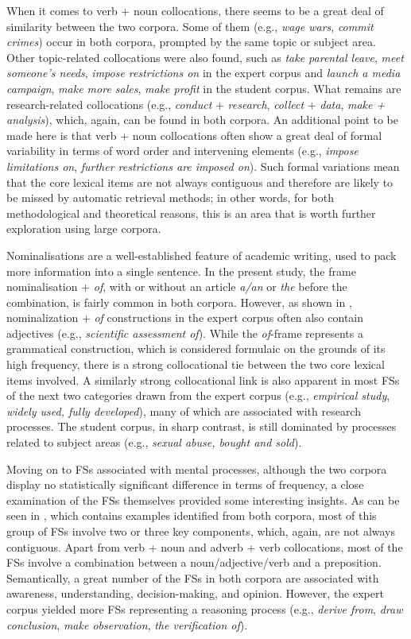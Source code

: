 When it comes to verb + noun collocations, there seems to be a great deal of similarity between the two corpora. Some of them (e.g., \textit{wage wars}, \textit{commit crimes}) occur in both corpora, prompted by the same topic or subject area. Other topic-related collocations were also found, such as \textit{take parental leave}, \textit{meet someone’s needs}, \textit{impose restrictions on} in the expert corpus and \textit{launch a media campaign}, \textit{make more sales}, \textit{make profit} in the student corpus. What remains are research-related collocations (e.g., \textit{conduct} + \textit{research}, \textit{collect} + \textit{data}, \textit{make + analysis}), which, again, can be found in both corpora. An additional point to be made here is that verb + noun collocations often show a great deal of formal variability in terms of word order and intervening elements (e.g., \textit{impose limitations on}, \textit{further restrictions are imposed on}). Such formal variations mean that the core lexical items are not always contiguous and therefore are likely to be missed by automatic retrieval methods; in other words, for both methodological and theoretical reasons, this is an area that is worth further exploration using large corpora. 

Nominalisations are a well-established feature of academic writing, used to pack more information into a single sentence. In the present study, the frame nominalisation + \textit{of}, with or without an article \textit{a/an} or \textit{the} before the combination, is fairly common in both corpora. However, as shown in , nominalization + \textit{of} constructions in the expert corpus often also contain adjectives (e.g., \textit{scientific assessment of}). While the \textit{of}{}-frame represents a grammatical construction, which is considered formulaic on the grounds of its high frequency, there is a strong collocational tie between the two core lexical items involved. A similarly strong collocational link is also apparent in most FSs of the next two categories drawn from the expert corpus (e.g., \textit{empirical study}, \textit{widely used, fully developed}), many of which are associated with research processes. The student corpus, in sharp contrast, is still dominated by processes related to subject areas (e.g., \textit{sexual abuse, bought and sold}). 

Moving on to FSs associated with mental processes, although the two corpora display no statistically significant difference in terms of frequency, a close examination of the FSs themselves provided some interesting insights. As can be seen in , which contains examples identified from both corpora, most of this group of FSs involve two or three key components, which, again, are not always contiguous. Apart from verb + noun and adverb + verb collocations, most of the FSs involve a combination between a noun/adjective/verb and a preposition. Semantically, a great number of the FSs in both corpora are associated with awareness, understanding, decision-making, and opinion. However, the expert corpus yielded more FSs representing a reasoning process (e.g., \textit{derive from}, \textit{draw conclusion}, \textit{make observation}, \textit{the verification of}).


